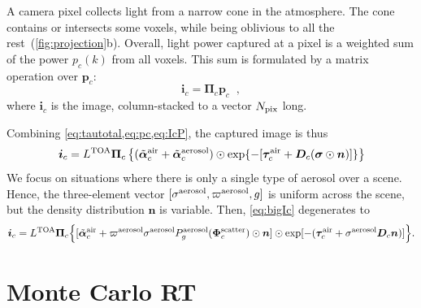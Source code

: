 \documentclass[10pt,letterpaper]{article}
\newcommand{\vect}[1]{\bm{#1}}
\newcommand{\yoavcomment}[1]{}
\renewcommand{\yoavcomment}[1]{#1} %
\begin{document}
A camera pixel collects light from a narrow cone in the
atmosphere. The cone contains or intersects some voxels, while being oblivious to all the rest~(\cref{fig:projection}b).
Overall, light power captured at a pixel is a weighted sum of the power
$p_c(k)$ from all voxels.  This sum is formulated by a matrix
operation over ${\bm p}_c$:
\begin{equation}
  {\bm i}_c= {\vect{\Pi}}_c{\bm p}_c
  \;\;,
  \label{eq:IcP}
\end{equation}
where ${\bm i}_c$ is the image, column-stacked to a
vector $N_{\rm pix}$ long.

Combining \cref{eq:tautotal,eq:pc,eq:IcP}, the captured image is thus
\begin{align}
  {\bm i}_c= L^{\rm TOA} {\vect{\Pi}}_c \left\{
    (\tilde{\vect{\alpha}}^{\rm air}_c + \tilde{\vect{\alpha}}^{\rm
      aerosol}_c) \odot \exp\{-[\vect{\tau}_c^{\rm air} + {\bm D}_c
    (\vect{\sigma} \odot {\bm n})]\} \right\}
  \label{eq:bigIc}
\end{align}
We focus on situations where there is only a single
type of aerosol over a scene. Hence, the three-element vector
$[{\sigma}^{\rm aerosol},\varpi^{\rm aerosol},g]$ is uniform across
the scene, but the density distribution ${\bm n}$ is variable. Then,
\cref{eq:bigIc} degenerates to
\begin{align}
  {\bm i}_c= L^{\rm TOA} {\vect{\Pi}}_c \Big\{
  [\tilde{\vect{\alpha}}^{\rm air}_c + \varpi^{\rm
    aerosol}\sigma^{\rm aerosol} P^{\rm aerosol}_g(\vect{\Phi}^{\rm
    scatter}_c) \odot{\bm n} ]
  \odot
  \exp[-(\vect{\tau}_c^{\rm air} + {\sigma}^{\rm aerosol} {\bm D}_c{\bm n})]
    \Big\} .
  \label{eq:bigIA}
\end{align}


\section{Monte Carlo RT}
\label{sec:monte-carlo-simul}
\end{document}
